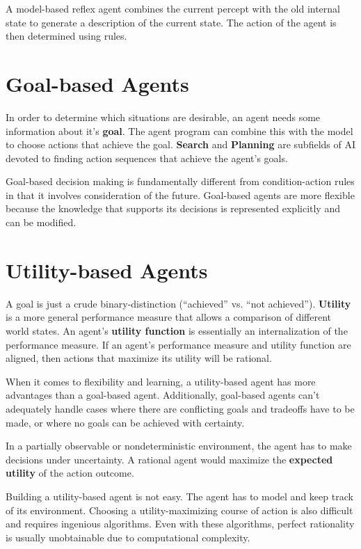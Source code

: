 \documentclass{article}
\begin{document}
A model-based reflex agent combines the current percept with the old internal state
to generate a description of the current state. The action of the agent is then
determined using rules.

\section{Goal-based Agents}

In order to determine which situations are desirable, an agent needs some information
about it's \textbf{goal}. The agent program can combine this with the model to choose
actions that achieve the goal. \textbf{Search} and \textbf{Planning} are subfields of AI
devoted to finding action sequences that achieve the agent's goals.

Goal-based decision making is fundamentally different from condition-action rules in 
that it involves consideration of the future. Goal-based agents are more flexible because
the knowledge that supports its decisions is represented explicitly and can be modified.

\section{Utility-based Agents}

A goal is just a crude binary-distinction (``achieved'' vs. ``not achieved'').
\textbf{Utility} is a more general performance measure that allows a comparison of
different world states. An agent's \textbf{utility function} is essentially an
internalization of the performance measure.  If an agent's performance measure
and utility function are aligned, then actions that maximize its utility will
be rational.

When it comes to flexibility and learning, a utility-based agent has more advantages
than a goal-based agent. Additionally, goal-based agents can't adequately handle cases
where there are conflicting goals and tradeoffs have to be made, or where no goals
can be achieved with certainty. 

In a partially observable or nondeterministic environment, the agent has to make decisions
under uncertainty. A rational agent would maximize the \textbf{expected utility} of the action
outcome. 

Building a utility-based agent is not easy. The agent has to model and keep track
of its environment. Choosing a utility-maximizing course of action is also difficult and
requires ingenious algorithms. Even with these algorithms, perfect rationality
is usually unobtainable due to computational complexity.
\end{document}
